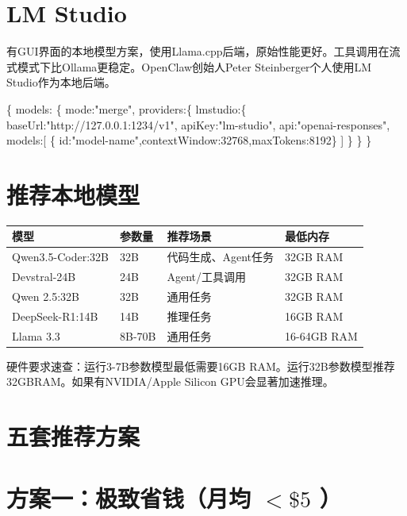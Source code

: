 \documentclass[
  10
]{article}
\newenvironment{Shaded}{}{}
\newcommand{\NormalTok}[1]{#1}
\newcounter{none} %
\begin{document}
\section{LM Studio}\label{lm-studio}

有GUI界面的本地模型方案，使用Llama.cpp后端，原始性能更好。工具调用在流式模式下比Ollama更稳定。OpenClaw创始人Peter
Steinberger个人使用LM Studio作为本地后端。

\begin{Shaded}
\begin{Highlighting}[]
\NormalTok{\{ models: \{ mode:"merge", providers:\{ lmstudio:\{ baseUrl:"http://127.0.0.1:1234/v1", apiKey:"lm{-}studio", api:"openai{-}responses", models:[ \{ id:"model{-}name",contextWindow:32768,maxTokens:8192\} ] \} \} \}}
\end{Highlighting}
\end{Shaded}

\section{推荐本地模型}\label{ux63a8ux8350ux672cux5730ux6a21ux578b}

{\def\LTcaptype{none} %
\begin{longtable}[]{@{}|l|l|l|l|@{}}
\toprule\noalign{}
\endhead
\bottomrule\noalign{}
\endlastfoot
\hline
模型 & 参数量 & 推荐场景 & 最低内存 \\
\hline
Qwen3.5-Coder:32B & 32B & 代码生成、Agent任务 & 32GB RAM \\
\hline
Devstral-24B & 24B & Agent/工具调用 & 32GB RAM \\
\hline
Qwen 2.5:32B & 32B & 通用任务 & 32GB RAM \\
\hline
DeepSeek-R1:14B & 14B & 推理任务 & 16GB RAM \\
\hline
Llama 3.3 & 8B-70B & 通用任务 & 16-64GB RAM \\
\hline
\end{longtable}
}

硬件要求速查：运行3-7B参数模型最低需要16GB
RAM。运行32B参数模型推荐32GBRAM。如果有NVIDIA/Apple Silicon
GPU会显著加速推理。

\section{五套推荐方案}\label{ux4e94ux5957ux63a8ux8350ux65b9ux6848}

\section{\texorpdfstring{方案一：极致省钱（月均 \({ < } \$ 5\)
）}{方案一：极致省钱（月均 \{ \textless{} \} \textbackslash\$ 5 ）}}\label{ux65b9ux6848ux4e00ux6781ux81f4ux7701ux94b1ux6708ux5747-5}
\end{document}

